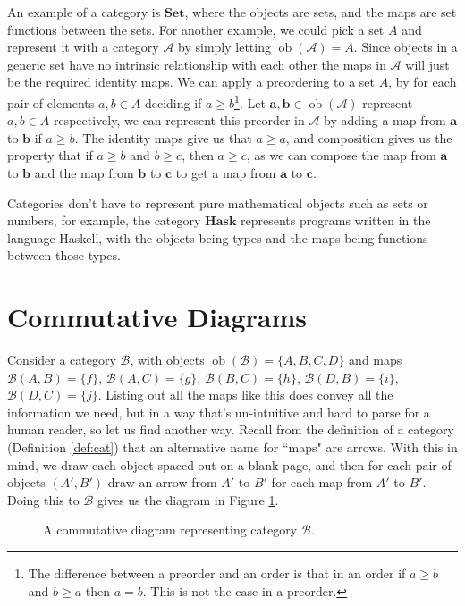 \documentclass[logo,bsc,singlespacing,parskip]{infthesis}
\theoremstyle{definition}
\newcommand{\cat}[1]{\mathscr{#1}}
\newcommand{\ob}[1]{\obj(\mathscr{#1})}
\DeclareMathOperator{\obj}{ob}
\begin{document}
An example of a category is $\mathbf{Set}$, where the objects are sets, and the maps are set functions between the sets. For another example, we could pick a set $A$ and represent it with a category $\cat{A}$ by simply letting $\ob{A} = A$. Since objects in a generic set have no intrinsic relationship with each other the maps in $\cat{A}$ will just be the required identity maps. We can apply a preordering to a set $A$, by for each pair of elements $a,b \in A$ deciding if $a \ge b$\footnote{The difference between a preorder and an order is that in an order if $a \ge b$ and $b \ge a$ then $a = b$. This is not the case in a preorder.}. Let $\mathbf{a}, \mathbf{b} \in \ob{A}$ represent $a,b \in A$ respectively, we can represent this preorder in $\cat A$ by adding a map from $\mathbf{a}$ to $\mathbf{b}$ if $a \ge b$. The identity maps give us that $a \ge a$, and composition gives us the property that if $a \ge b$ and $b \ge c$, then $a \ge c$, as we can compose the map from $\mathbf{a}$ to $\mathbf{b}$ and the map from $\mathbf{b}$ to $\mathbf{c}$ to get a map from $\mathbf{a}$ to $\mathbf{c}$. 

Categories don't have to represent pure mathematical objects such as sets or numbers, for example, the category $\mathbf{Hask}$ \cite{wiki:hask} represents programs written in the language Haskell, with the objects being types and the maps being functions between those types. 

\section{Commutative Diagrams}\label{bkg:diag}
Consider a category $\cat B$, with objects $\ob{B} = \{A,B,C,D\}$ and maps $\cat{B}(A,B) = \{f\}$, $\cat{B}(A,C) = \{g\}$, $\cat{B}(B,C) = \{h\}$, $\cat{B}(D,B) = \{i\}$, $\cat{B}(D,C) = \{j\}$. Listing out all the maps like this does convey all the information we need, but in a way that's un-intuitive and hard to parse for a human reader, so let us find another way. Recall from the definition of a category (Definition \ref{def:cat}) that an alternative name for ``maps" are arrows. With this in mind, we draw each object spaced out on a blank page, and then for each pair of objects $(A', B')$ draw an arrow from $A'$ to $B'$ for each map from $A'$ to $B'$. Doing this to $\cat B$ gives us the diagram in Figure \ref{fig:comm-diag-ex1}.

\begin{figure}[h]
    \centering
    \caption{A commutative diagram representing category $\cat B$.}
    \label{fig:comm-diag-ex1}
\end{figure}
\end{document}
